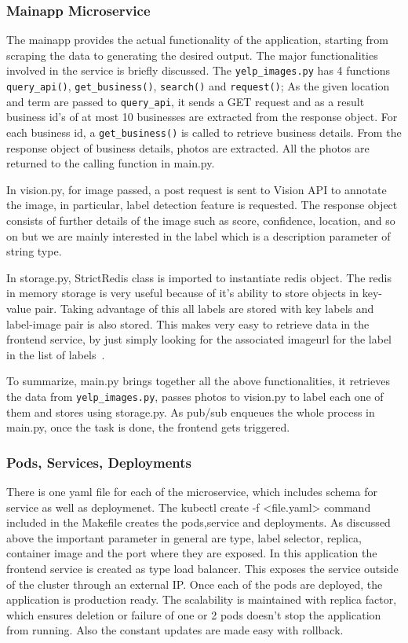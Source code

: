 \subsubsection{Mainapp Microservice}

The mainapp provides the actual functionality of the application,
starting from scraping the data to generating the desired output. The
major functionalities involved in the service is briefly discussed.
The \verb|yelp_images.py| has 4 functions \verb|query_api()|,
\verb|get_business()|, \verb|search()| and \verb|request()|; As the
given location and term are passed to \verb|query_api|, it sends a GET
request and as a result business id’s of at most 10 businesses are
extracted from the response object. For each business id, a
\verb|get_business()| is called to retrieve business details. From the
response object of business details, photos are extracted. All the
photos are returned to the calling function in main.py.

In vision.py, for image passed, a post request is sent to Vision API
to annotate the image, in particular, label detection feature is
requested. The response object consists of further details of the
image such as score, confidence, location, and so on but we are mainly
interested in the label which is a description parameter of string
type.

In storage.py, StrictRedis class is imported to instantiate redis
object. The redis in memory storage is very useful because of it’s
ability to store objects in key-value pair. Taking advantage of this
all labels are stored with key labels and label-image pair is also
stored. This makes very easy to retrieve data in the frontend service,
by just simply looking for the associated imageurl for the label in
the list of labels~\cite{hid-sp18-602-redis-implementation}.

To summarize, main.py brings together all the above functionalities,
it retrieves the data from \verb|yelp_images.py|, passes photos to
vision.py to label each one of them and stores using storage.py. As
pub/sub enqueues the whole process in main.py, once the task is done,
the frontend gets triggered.
  
\subsubsection{Pods, Services, Deployments} 

There is one yaml file for each of the microservice, which includes
schema for service as well as deploymenet. The
kubectl create -f <file.yaml> command included in the Makefile
creates the pods,service and deployments. As discussed above the
important parameter in general are type, label selector, replica,
container image and the port where they are exposed.  In this
application the frontend service is created as type load
balancer. This exposes the service outside of the cluster through an
external IP. Once each of the pods are deployed, the application is
production ready. The scalability is maintained with replica factor,
which ensures deletion or failure of one or 2 pods doesn’t stop the
application from running. Also the constant updates are made easy with
rollback.
  
